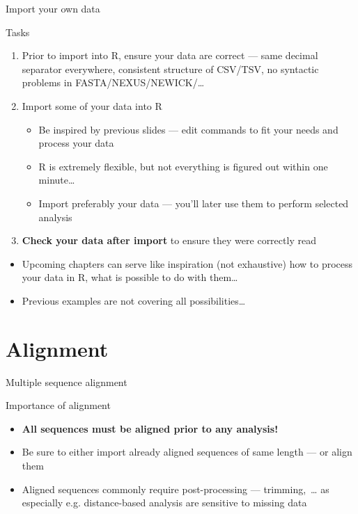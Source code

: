 \documentclass[compress, ucs, xelatex, 11pt, xcolor=svgnames, aspectratio=169,
	hyperref={
		bookmarks=true,
		unicode=true,
		colorlinks=true,
		pdftitle={Molecular data in R},
		plainpages=false,
		pdfauthor={Vojtech Zeisek},
		pdfsubject={Course about phylogeny and evolution in R},
		pdfcreator={XeLaTeX},
		pdfkeywords={R, evolution, phylogeny, molecular data},
		linkcolor=Crimson, %
		anchorcolor=Magenta, %
		citecolor=Magenta, %
		filecolor=Magenta, %
		menucolor=Magenta, %
		urlcolor=DodgerBlue, %
		pdftex},
	url={hyphens, lowtilde} %
	]{beamer}
\begin{document}
\begin{frame}{Import your own data}
	\begin{exampleblock}{Tasks}
		\begin{enumerate}
			\item Prior to import into R, \alert{ensure your data are correct} --- same decimal separator everywhere, consistent structure of CSV/TSV, no syntactic problems in FASTA/NEXUS/NEWICK/\ldots
			\item Import some of your data into R
			\begin{itemize}
				\item Be inspired by previous slides --- edit commands to fit your needs and process your data
				\item R is extremely flexible, but not everything is figured out within one minute\ldots
				\item Import preferably your data --- you'll later use them to perform selected analysis
			\end{itemize}
			\item \textbf{Check your data after import} to ensure they were correctly read
		\end{enumerate}
	\end{exampleblock}
	\begin{itemize}
		\item Upcoming chapters can serve like inspiration (not exhaustive) how to process your data in R, what is possible to do with them\ldots
		\item Previous examples are not covering all possibilities\ldots
	\end{itemize}
\end{frame}

\section{Alignment}

\begin{frame}[fragile]{Multiple sequence alignment}
	\tableofcontents[currentsection, sectionstyle=show/hide, hideothersubsections]
	\begin{alertblock}{Importance of alignment}
		\begin{itemize}
			\item \textbf{All sequences must be aligned prior to any analysis!}
			\item Be sure to either import already aligned sequences of same length --- or align them
			\item Aligned sequences commonly require post-processing --- trimming,~\ldots{ }as especially e.g. distance-based analysis are sensitive to missing data
		\end{itemize}
	\end{alertblock}
\end{frame}
\end{document}
